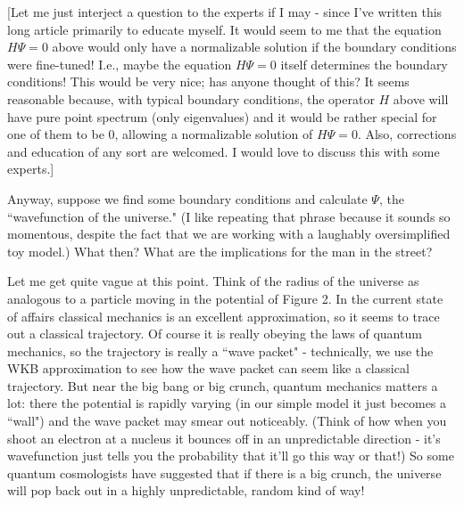 [Let me just interject a question to the experts if I may - since I've written this long article primarily to educate myself. It would seem to me that the equation $H\Psi = 0$ above would only have a normalizable solution if the boundary conditions were fine-tuned! I.e., maybe the equation $H\Psi = 0$ itself determines the boundary conditions! This would be very nice; has anyone thought of this? It seems reasonable because, with typical boundary conditions, the operator $H$ above will have pure point spectrum (only eigenvalues) and it would be rather special for one of them to be 0, allowing a normalizable solution of $H\Psi = 0$. Also, corrections and education of any sort are welcomed. I would love to discuss this with some experts.]

Anyway, suppose we find some boundary conditions and calculate $\Psi$, the ``wavefunction of the universe." (I like repeating that phrase because it sounds so momentous, despite the fact that we are working with a laughably oversimplified toy model.) What then? What are the implications for the man in the street?

Let me get quite vague at this point. Think of the radius of the universe as analogous to a particle moving in the potential of Figure 2. In the current state of affairs classical mechanics is an excellent approximation, so it seems to trace out a classical trajectory. Of course it is really obeying the laws of quantum mechanics, so the trajectory is really a ``wave packet" - technically, we use the WKB approximation to see how the wave packet can seem like a classical trajectory. But near the big bang or big crunch, quantum mechanics matters a lot: there the potential is rapidly varying (in our simple model it just becomes a ``wall") and the wave packet may smear out noticeably. (Think of how when you shoot an electron at a nucleus it bounces off in an unpredictable direction - it's wavefunction just tells you the probability that it'll go this way or that!) So some quantum cosmologists have suggested that if there is a big crunch, the universe will pop back out in a highly unpredictable, random kind of way!

